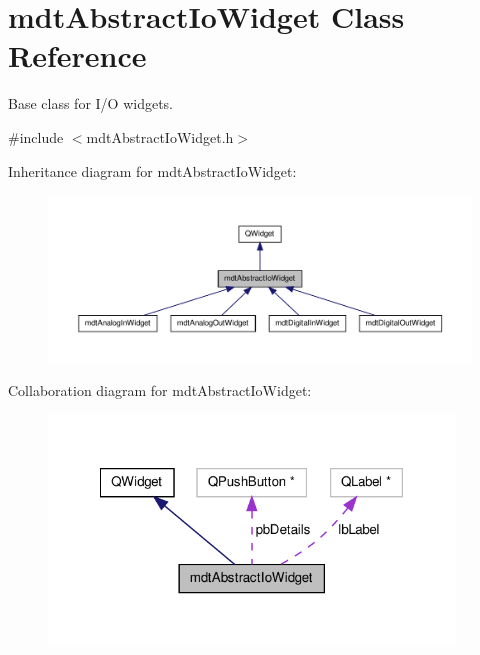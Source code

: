 \hypertarget{classmdt_abstract_io_widget}{\section{mdt\-Abstract\-Io\-Widget Class Reference}
\label{classmdt_abstract_io_widget}
}


Base class for I/\-O widgets.  




{\ttfamily \#include $<$mdt\-Abstract\-Io\-Widget.\-h$>$}



Inheritance diagram for mdt\-Abstract\-Io\-Widget\-:
\nopagebreak
\begin{figure}[H]
\begin{center}
\leavevmode
\includegraphics[width=350pt]{classmdt_abstract_io_widget__inherit__graph}
\end{center}
\end{figure}


Collaboration diagram for mdt\-Abstract\-Io\-Widget\-:
\nopagebreak
\begin{figure}[H]
\begin{center}
\leavevmode
\includegraphics[width=306pt]{classmdt_abstract_io_widget__coll__graph}
\end{center}
\end{figure}
